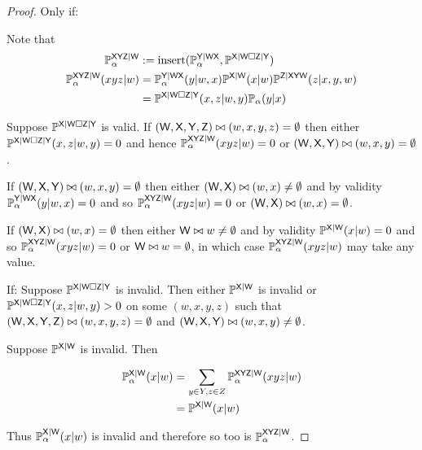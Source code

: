 \begin{proof}
Only if:

Note that
\begin{align}
	\mathbb{P}_\alpha^{\mathsf{XYZ}|\mathsf{W}}&:=\text{insert}(\mathbb{P}_\alpha^{\mathsf{Y}|\mathsf{WX}},\mathbb{P}^{\mathsf{X}|\mathsf{W}\square\mathsf{Z}|\mathsf{Y}})\\
	\mathbb{P}_\alpha^{\mathsf{XYZ}|\mathsf{W}}(xyz|w) &= \mathbb{P}^{\mathsf{Y}|\mathsf{WX}}_\alpha(y|w,x)\mathbb{P}^{\mathsf{X}|\mathsf{W}}(x|w)\mathbb{P}^{\mathsf{Z}|\mathsf{XYW}}(z|x,y,w)\\
	&= \mathbb{P}^{\mathsf{X}|\mathsf{W}\square\mathsf{Z}|\mathsf{Y}}(x,z|w,y)\mathbb{P}_\alpha(y|x)
\end{align}

Suppose $\mathbb{P}^{\mathsf{X}|\mathsf{W}\square\mathsf{Z}|\mathsf{Y}}$ is valid. If $(\mathsf{W},\mathsf{X},\mathsf{Y},\mathsf{Z})\bowtie(w,x,y,z)=\emptyset$ then either $\mathbb{P}^{\mathsf{X}|\mathsf{W}\square\mathsf{Z}|\mathsf{Y}}(x,z|w,y)=0$ and hence $\mathbb{P}_\alpha^{\mathsf{XYZ}|\mathsf{W}}(xyz|w)=0$ or $(\mathsf{W},\mathsf{X},\mathsf{Y})\bowtie(w,x,y)=\emptyset$.

If $(\mathsf{W},\mathsf{X},\mathsf{Y})\bowtie(w,x,y)=\emptyset$ then either $(\mathsf{W},\mathsf{X})\bowtie (w,x)\neq\emptyset$ and by validity $\mathbb{P}^{\mathsf{Y}|\mathsf{WX}}_\alpha(y|w,x)=0$ and so $\mathbb{P}_\alpha^{\mathsf{XYZ}|\mathsf{W}}(xyz|w)=0$ or $(\mathsf{W},\mathsf{X})\bowtie(w,x)=\emptyset$.

If $(\mathsf{W},\mathsf{X})\bowtie(w,x)=\emptyset$ then either $\mathsf{W}\bowtie w\neq \emptyset$ and by validity $\mathbb{P}^{\mathsf{X}|\mathsf{W}}(x|w)=0$ and so $\mathbb{P}_\alpha^{\mathsf{XYZ}|\mathsf{W}}(xyz|w)=0$ or $\mathsf{W}\bowtie w=\emptyset$, in which case $\mathbb{P}_\alpha^{\mathsf{XYZ}|\mathsf{W}}(xyz|w)$ may take any value.

If:
Suppose $\mathbb{P}^{\mathsf{X}|\mathsf{W}\square\mathsf{Z}|\mathsf{Y}}$ is invalid. Then either $\mathbb{P}^{\mathsf{X}|\mathsf{W}}$ is invalid or $\mathbb{P}^{\mathsf{X}|\mathsf{W}\square\mathsf{Z}|\mathsf{Y}}(x,z|w,y)>0$ on some $(w,x,y,z)$ such that $(\mathsf{W},\mathsf{X},\mathsf{Y},\mathsf{Z})\bowtie(w,x,y,z)= \emptyset$ and $(\mathsf{W},\mathsf{X},\mathsf{Y})\bowtie(w,x,y)\neq \emptyset$.

Suppose $\mathbb{P}^{\mathsf{X}|\mathsf{W}}$ is invalid. Then

\begin{align}
	\mathbb{P}_\alpha^{\mathsf{X}|\mathsf{W}}(x|w) &= \sum_{y\in Y,z\in Z}\mathbb{P}_\alpha^{\mathsf{XYZ}|\mathsf{W}}(xyz|w)\\
										 &= \mathbb{P}^{\mathsf{X}|\mathsf{W}}(x|w)
\end{align}

Thus $\mathbb{P}_\alpha^{\mathsf{X}|\mathsf{W}}(x|w)$ is invalid and therefore so too is $\mathbb{P}_\alpha^{\mathsf{XYZ}|\mathsf{W}}$.


\end{proof}
